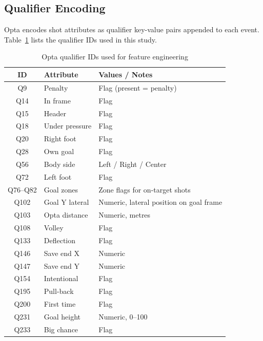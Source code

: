 \documentclass[12pt,a4paper]{article}
\begin{document}
\subsection{Qualifier Encoding}

Opta encodes shot attributes as qualifier key-value pairs appended to each event. Table~\ref{tab:qualifiers} lists the qualifier IDs used in this study.

\begin{table}[H]
\centering
\caption{Opta qualifier IDs used for feature engineering}
\label{tab:qualifiers}
\begin{tabular}{cll}
\toprule
\textbf{ID} & \textbf{Attribute} & \textbf{Values / Notes} \\
\midrule
Q9   & Penalty             & Flag (present = penalty) \\
Q14  & In frame            & Flag \\
Q15  & Header              & Flag \\
Q18  & Under pressure      & Flag \\
Q20  & Right foot          & Flag \\
Q28  & Own goal            & Flag \\
Q56  & Body side           & Left / Right / Center \\
Q72  & Left foot           & Flag \\
Q76--Q82 & Goal zones      & Zone flags for on-target shots \\
Q102 & Goal Y lateral      & Numeric, lateral position on goal frame \\
Q103 & Opta distance       & Numeric, metres \\
Q108 & Volley              & Flag \\
Q133 & Deflection          & Flag \\
Q146 & Save end X          & Numeric \\
Q147 & Save end Y          & Numeric \\
Q154 & Intentional         & Flag \\
Q195 & Pull-back           & Flag \\
Q200 & First time          & Flag \\
Q231 & Goal height         & Numeric, 0--100 \\
Q233 & Big chance          & Flag \\
\bottomrule
\end{tabular}
\end{table}

\end{document}
